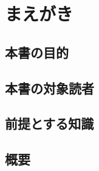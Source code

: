 \documentclass[./main]{subfiles}
\begin{document}
\chapter{まえがき}

\section*{本書の目的}


\section*{本書の対象読者}


\section*{前提とする知識}


\section*{概要}
\end{document}
